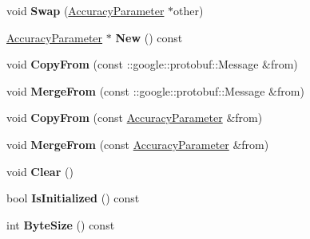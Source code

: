 \begin{DoxyCompactItemize}
void {\bfseries Swap} (\mbox{\hyperlink{classcaffe_1_1_accuracy_parameter}{Accuracy\+Parameter}} $\ast$other)
\item 
\mbox{\label{classcaffe_1_1_accuracy_parameter_aeffd2d228209e319619318e6f84efd1d}} 
\mbox{\hyperlink{classcaffe_1_1_accuracy_parameter}{Accuracy\+Parameter}} $\ast$ {\bfseries New} () const
\item 
\mbox{\label{classcaffe_1_1_accuracy_parameter_a408ec5c7e2f3983e57a766f361381e2e}} 
void {\bfseries Copy\+From} (const \+::google\+::protobuf\+::\+Message \&from)
\item 
\mbox{\label{classcaffe_1_1_accuracy_parameter_a8450a78d36eff284587e92567da36ed6}} 
void {\bfseries Merge\+From} (const \+::google\+::protobuf\+::\+Message \&from)
\item 
\mbox{\label{classcaffe_1_1_accuracy_parameter_acc2fd487a271b0f706f4e8d69ffcee2f}} 
void {\bfseries Copy\+From} (const \mbox{\hyperlink{classcaffe_1_1_accuracy_parameter}{Accuracy\+Parameter}} \&from)
\item 
\mbox{\label{classcaffe_1_1_accuracy_parameter_a3b08be88b78c1291a09c86d1193b34c4}} 
void {\bfseries Merge\+From} (const \mbox{\hyperlink{classcaffe_1_1_accuracy_parameter}{Accuracy\+Parameter}} \&from)
\item 
\mbox{\label{classcaffe_1_1_accuracy_parameter_a057b92b65e706d5093dce1b0b00b9dcf}} 
void {\bfseries Clear} ()
\item 
\mbox{\label{classcaffe_1_1_accuracy_parameter_a806a21aa5524abf91b98aa7bdc1e4aaf}} 
bool {\bfseries Is\+Initialized} () const
\item 
\mbox{\label{classcaffe_1_1_accuracy_parameter_ae5a7598273761de8de02b5b52443c7a1}} 
int {\bfseries Byte\+Size} () const
\item 
\mbox{\label{classcaffe_1_1_accuracy_parameter_ae00aba2c2364902786f84aa69861e7c8}} 

\end{DoxyCompactItemize}
